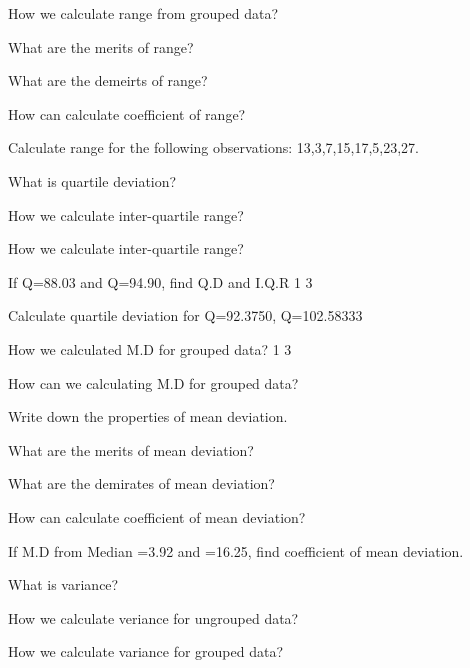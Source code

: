 \documentclass[11pt,a4paper]{article}
\begin{document}
\begin{shortlist}
\item How we calculate range from grouped data?

\item What are the merits of range?

\item What are the demeirts of range?

\item How can calculate coefficient of range?

\item Calculate range for the following observations: 13,3,7,15,17,5,23,27.

\item What is quartile deviation?

\item How we calculate inter-quartile range?

\item How we calculate inter-quartile range?

\item If Q=88.03 and Q=94.90, find Q.D and I.Q.R 1 3

\item Calculate quartile deviation for Q=92.3750, Q=102.58333

\item How we calculated M.D for grouped data? 1 3

\item How can we calculating M.D for grouped data?

\item Write down the properties of mean deviation.

\item What are the merits of mean deviation?

\item What are the demirates of mean deviation?

\item How can calculate coefficient of mean deviation?

\item If M.D from Median =3.92 and =16.25, find coefficient of mean deviation.

\item What is variance?

\item How we calculate veriance for ungrouped data?

\item How we calculate variance for grouped data?


\end{shortlist}
\end{document}
